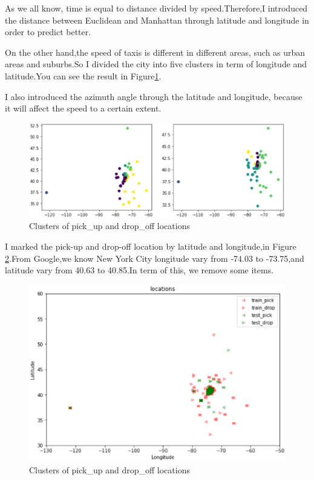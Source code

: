 \par As we all know, time is equal to distance divided by speed.Therefore,I introduced the distance between Euclidean and Manhattan through latitude and longitude in order to predict better.
\par On the other hand,the speed of taxis is different in different areas, such as urban areas and suburbs.So I divided the city into five clusters in term of longitude and latitude.You can see the result in Figure\ref{15}.
\par I also introduced the azimuth angle through the latitude and longitude, because it will affect the speed to a certain extent.
\begin{figure}[htbp]
	\centering
	\includegraphics[scale=0.4]{figures/15.eps}
	\caption{Clusters of pick\_up and drop\_off locations } \label{15}
\end{figure}
\par I marked the pick-up and drop-off location by latitude and longitude,in Figure \ref{16}.From Google,we know New York City longitude vary from -74.03 to -73.75,and latitude vary from 40.63 to 40.85.In term of this, we remove some items.
\begin{figure}[htbp]
	\centering
	\includegraphics[scale=0.4]{figures/16.eps}
	\caption{Clusters of pick\_up and drop\_off locations } \label{16}
\end{figure}

